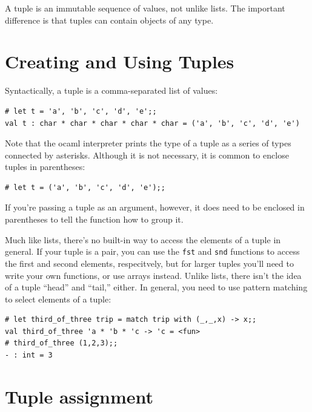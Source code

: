 \documentclass[10pt]{book}
\begin{document}

A tuple is an immutable sequence of values, not unlike lists. The important difference is that tuples can contain objects of any type.

\section{Creating and Using Tuples}

Syntactically, a tuple is a comma-separated list of values:

\beforeverb
\begin{verbatim}
# let t = 'a', 'b', 'c', 'd', 'e';;
val t : char * char * char * char * char = ('a', 'b', 'c', 'd', 'e')
\end{verbatim}
\afterverb
%
Note that the ocaml interpreter prints the type of a tuple as a series of types connected by asterisks. Although it is not necessary, it is common to enclose tuples in
parentheses:


\beforeverb
\begin{verbatim}
# let t = ('a', 'b', 'c', 'd', 'e');;
\end{verbatim}
\afterverb
%
If you're passing a tuple as an argument, however, it does need to be enclosed in parentheses to tell the function how to group it.

Much like lists, there's no built-in way to access the elements of a tuple in general. If your tuple is a pair, you can use the {\tt fst} and {\tt snd} functions to access the first and second elements, respecitvely, but for larger tuples you'll need to write your own functions, or use arrays instead. Unlike lists, there isn't the idea of a tuple ``head'' and ``tail,'' either. In general, you need to use pattern matching to select elements of a tuple:

\beforeverb
\begin{verbatim}
# let third_of_three trip = match trip with (_,_,x) -> x;;
val third_of_three 'a * 'b * 'c -> 'c = <fun>
# third_of_three (1,2,3);;
- : int = 3
\end{verbatim}
\afterverb

\section{Tuple assignment}
\label{tuple assignment}

\end{document}
